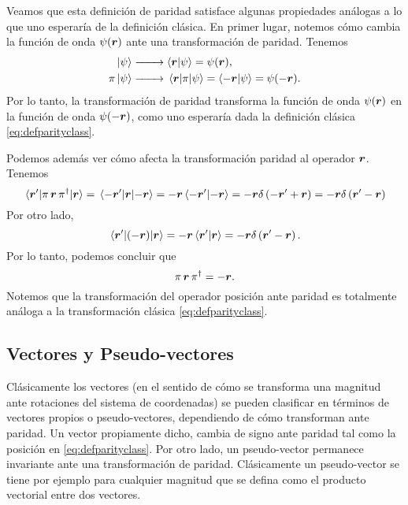 \documentclass[10pt, a4paper]{article}
\numberwithin{equation}{subsection}
\begin{document}
Veamos que esta definición de paridad satisface algunas propiedades análogas a
lo que uno esperaría de la definición clásica. En primer lugar, notemos cómo
cambia la función de onda $\psi(\vb*{r})$ ante una transformación de paridad.
Tenemos
\begin{align}
  \ket{\psi} &\xrightarrow{\qquad} \braket{\vect{r}}{\psi} = \psi(\vect{r}), \\
  \parityop\ket{\psi} &\xrightarrow{\qquad}
    \matrixel{\vect{r}}{\parityop}{\psi} = \braket{-\vect{r}}{\psi} =
    \psi(-\vect{r}). \label{eq:paritywavefunc}
\end{align}
Por lo tanto, la transformación de paridad transforma la función de onda
$\psi(\vb*{r})$ en la función de onda $\psi(-\vb*{r})$, como uno esperaría
dada la definición clásica \eqref{eq:defparityclass}.

Podemos además ver cómo afecta la transformación paridad al operador
$\vb*{r}$. Tenemos
\begin{equation}
  \matrixel{\vect{r}'}{\parityop\,\vect{r}\,\parityop^\dagger}{\vect{r}}
  = \matrixel{-\vect{r}'}{\vect{r}}{-\vect{r}}
  = -\vect{r}\braket{-\vect{r}'}{-\vect{r}}
  = -\vect{r}\delta\left(-\vect{r}' + \vect{r}\right)
  = -\vect{r}\delta\left(\vect{r}' - \vect{r}\right)
\end{equation}
Por otro lado,
\begin{equation}
  \matrixel{\vect{r}'}{\left(-\vect{r}\right)}{\vect{r}}
  = -\vect{r}\braket{\vect{r}'}{\vect{r}}
  = -\vect{r}\delta\left(\vect{r}' - \vect{r}\right).
\end{equation}
Por lo tanto, podemos concluir que
\begin{equation} \label{eq:paritytranspos}
  \pi\,\vb*{r}\,\pi^\dagger = -\vb*{r}.
\end{equation}
Notemos que la transformación del operador posición ante paridad es totalmente
análoga a la transformación clásica \eqref{eq:defparityclass}.

\subsection{Vectores y Pseudo-vectores}

Clásicamente los vectores (en el sentido de cómo se transforma una magnitud
ante rotaciones del sistema de coordenadas) se pueden clasificar en términos de
vectores propios o pseudo-vectores, dependiendo de cómo transforman ante
paridad. Un vector propiamente dicho, cambia de signo ante paridad tal como la
posición en \eqref{eq:defparityclass}. Por otro lado, un pseudo-vector
permanece invariante ante una transformación de paridad. Clásicamente un
pseudo-vector se tiene por ejemplo para cualquier magnitud que se defina como
el producto vectorial entre dos vectores.
\end{document}
